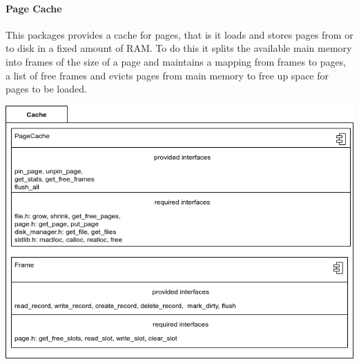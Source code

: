     \paragraph{Page Cache}
        This packages provides a cache for pages, that is it loads and stores pages from or to disk in a fixed amount of RAM. To do this it splits the available main memory into frames of the size of a page and maintains a mapping from frames to pages, a list of free frames and evicts pages from main memory to free up space for pages to be loaded.
        \begin{center}
         \includegraphics[keepaspectratio, width=\textwidth, height=0.4\textheight]{img/cache_arch.png} \\
        \end{center}
    
